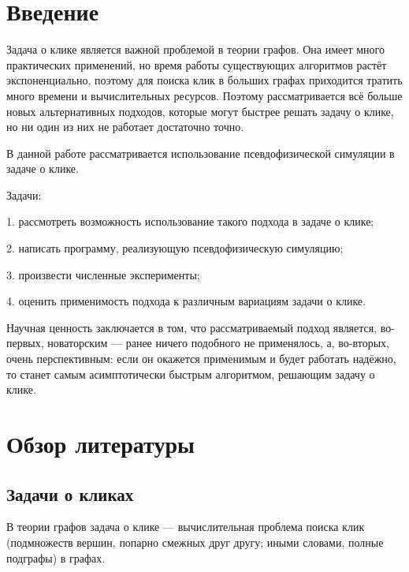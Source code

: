  \newcommand{\BibTeX}{{\sc Bib}\TeX}

\renewcommand{\tabcolsep}{5mm}
\lstset{xleftmargin=5mm}


\tableofcontents
\clearpage

\section*{Введение}
  Задача о клике является важной проблемой в теории графов.
  Она имеет много практических применений, но время работы существующих алгоритмов
  растёт экспоненциально, поэтому для поиска клик в больших графах приходится тратить
  много времени и вычислительных ресурсов. Поэтому рассматривается всё больше новых
  альтернативных подходов, которые могут быстрее решать задачу о клике, но ни один
  из них не работает достаточно точно.

  В данной работе рассматривается использование псевдофизической симуляции в задаче
  о клике.

  Задачи:
  
  1. рассмотреть возможность использование такого подхода в задаче о клике;
  
  2. написать программу, реализующую псевдофизическую симуляцию;
  
  3. произвести численные эксперименты;
  
  4. оценить применимость подхода к различным вариациям задачи о клике.

  Научная ценность заключается в том, что рассматриваемый подход является, во-первых,
  новаторским --- ранее ничего подобного не применялось, а, во-вторых, очень перспективным:
  если он окажется применимым и будет работать надёжно, то станет самым асимптотически
  быстрым алгоритмом, решающим задачу о клике.

\section{Обзор литературы}
  \subsection{Задачи о кликах}
  В теории графов задача о клике --- вычислительная проблема поиска клик
  (подмножеств вершин, попарно смежных друг другу;
  иными словами, полные подграфы) в графах.


